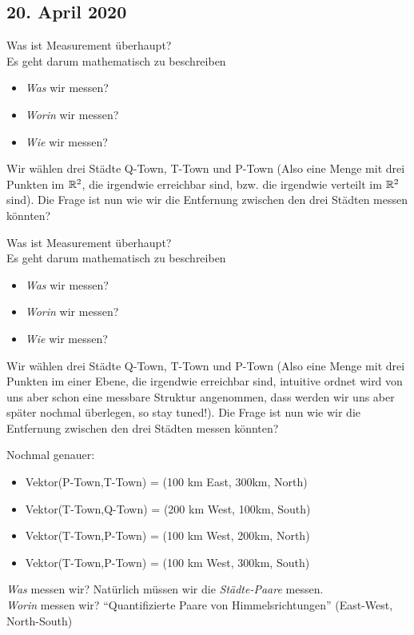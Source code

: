 \subsection*{20. April 2020}
Was ist Measurement überhaupt?\\
Es geht darum mathematisch zu beschreiben
\begin{itemize}
    \item \emph{Was} wir messen?
    \item \emph{Worin} wir messen?
    \item \emph{Wie} wir messen?
\end{itemize}

\begin{example}
    Wir wählen drei Städte Q-Town, T-Town und P-Town (Also eine Menge mit drei Punkten im $\mathbb{R}^2$, die irgendwie erreichbar sind, bzw. die irgendwie verteilt im $\mathbb{R}^2$ sind). Die Frage ist nun wie wir die Entfernung zwischen den drei Städten messen könnten?
\end{example}
Was ist Measurement überhaupt?\\
Es geht darum mathematisch zu beschreiben
\begin{itemize}
    \item \emph{Was} wir messen?
    \item \emph{Worin} wir messen?
    \item \emph{Wie} wir messen?
\end{itemize}

\begin{example}
    Wir wählen drei Städte Q-Town, T-Town und P-Town (Also eine Menge mit drei Punkten im einer Ebene, die irgendwie erreichbar sind, intuitive ordnet wird von uns aber schon eine messbare Struktur angenommen, dass werden wir uns aber später nochmal überlegen, so stay tuned!). Die Frage ist nun wie wir die Entfernung zwischen den drei Städten messen könnten?
\end{example}
\begin{example}
    Nochmal genauer:
    \begin{itemize}
        \item Vektor(P-Town,T-Town) = (100 km East, 300km, North)
        \item Vektor(T-Town,Q-Town) = (200 km West, 100km, South)
        \item Vektor(T-Town,P-Town) = (100 km West, 200km, North)
        \item Vektor(T-Town,P-Town) = (100 km West, 300km, South)
    \end{itemize}
    \emph{Was} messen wir? Natürlich müssen wir die \emph{Städte-Paare} messen.\\
    \emph{Worin} messen wir? ``Quantifizierte Paare von Himmelsrichtungen'' (East-West, North-South)
\end{example}
